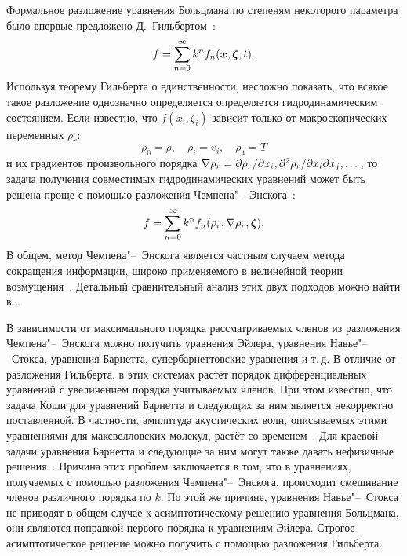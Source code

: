 Формальное разложение уравнения Больцмана по степеням некоторого параметра было впервые
предложено Д.~Гильбертом~\cite{Hilbert1912, Hilbert1924}:
\begin{equation}\label{eq:Hilbert_sum}
    f = \sum_{n=0}^\infty k^n f_n(\bx,\bzeta,t).
\end{equation}
Используя теорему Гильберта о единственности, несложно показать, что всякое такое разложение
однозначно определяется определяется гидродинамическим состоянием.
Если известно, что \(f(x_i,\zeta_i)\) зависит только от макроскопических переменных \(\rho_r\):
\begin{equation}\label{eq:Enskog_macro}
    \rho_0 = \rho, \quad \rho_i = v_i, \quad \rho_4 = T
\end{equation}
и их градиентов произвольного порядка \(\nabla\rho_r = \Pder[\rho_r]{x_i}, \Pderder[\rho_r]{x_i}{x_j},\dots\),
то задача получения совместимых гидродинамических уравнений может быть решена проще с
помощью разложения Чемпена"--~Энскога~\cite{Enskog1917, Chapman1960}:
\begin{equation}\label{eq:Enskog_sum}
    f = \sum_{n=0}^\infty k^n f_n(\rho_r,\nabla\rho_r,\bzeta).
\end{equation}
В общем, метод Чемпена"--~Энскога является частным случаем метода сокращения информации,
широко применяемого в нелинейной теории возмущения~\cite{Bogaevski1987,Bogaevski1991}.
Детальный сравнительный анализ этих двух подходов можно найти в~\cite{Grad1970, Cercignani1973}.

В зависимости от максимального порядка рассматриваемых членов из разложения Чемпена"--~Энскога
можно получить уравнения Эйлера, уравнения Навье"--~Стокса, уравнения Барнетта, супербарнеттовские уравнения и т.\,д.
В отличие от разложения Гильберта, в этих системах растёт порядок дифференциальных уравнений
с увеличением порядка учитываемых членов. При этом известно, что задача Коши для уравнений Барнетта
и следующих за ним является некорректно поставленной.
В частности, амплитуда акустических волн, описываемых этими уравнениями для максвелловских молекул,
растёт со временем~\cite{Bobylev1982}.
Для краевой задачи уравнения Барнетта и следующие за ним могут также давать нефизичные решения~\cite{Cercignani1973}.
Причина этих проблем заключается в том, что в уравнениях, получаемых с помощью разложения Чемпена"--~Энскога,
происходит смешивание членов различного порядка по \(k\).
По этой же причине, уравнения Навье"--~Стокса не приводят в общем случае
к асимптотическому решению уравнения Больцмана,
они являются поправкой первого порядка к уравнениям Эйлера.
Строгое асимптотическое решение можно получить с помощью разложения Гильберта.

